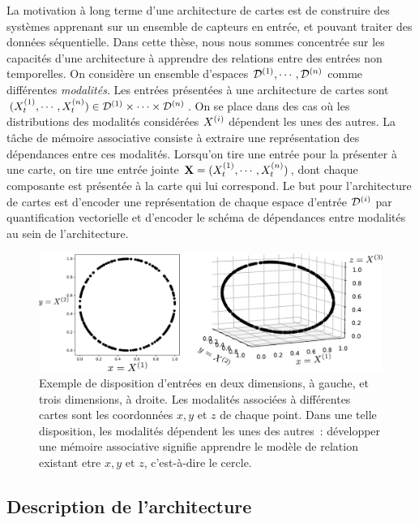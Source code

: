\documentclass[../main]{subfiles}
\begin{document}
La motivation à long terme d'une architecture de cartes est de construire des systèmes apprenant sur un ensemble de capteurs en entrée, et pouvant traiter des données séquentielle.
Dans cette thèse, nous nous sommes concentrée sur les capacités d'une architecture à apprendre des relations entre des entrées non temporelles. 
On considère un ensemble d'espaces $\mathcal{D}^{({1})}, \cdots , \mathcal{D}^{({n})}$ comme différentes \emph{modalités}.
Les entrées présentées à une architecture de cartes sont $(X^{({1})}_t, \cdots, X^{({n})}_t) \in \mathcal{D}^{({1})} \times \cdots \times \mathcal{D}^{({n})}$. On se place dans des cas où les distributions des modalités considérées $X^{({i})}$ dépendent les unes des autres. 
La tâche de mémoire associative consiste à extraire une représentation des dépendances entre ces modalités. 
Lorsqu'on tire une entrée pour la présenter à une carte, on tire une entrée jointe $\mathbf{X} =  (X^{({1})}_t, \cdots , X^{({n})}_t)$, dont chaque composante est présentée à la carte qui lui correspond. 
Le but pour l'architecture de cartes est d'encoder une représentation de chaque espace d'entrée $\mathcal{D}^{({i})}$ par quantification vectorielle et d'encoder le schéma de dépendances entre modalités au sein de l'architecture.

\begin{figure}
\centering
\includegraphics[width=\textwidth]{inputs_3som}
\caption{Exemple de disposition d'entrées en deux dimensions, à gauche, et trois dimensions, à droite. Les modalités associées à différentes cartes sont les coordonnées $x,y$ et $z$ de chaque point. Dans une telle disposition, les modalités dépendent les unes des autres~: développer une mémoire associative signifie apprendre le modèle de relation existant etre $x,y$ et $z$, c'est-à-dire le cercle.\label{fig:input_3som}}
\end{figure}

\subsection{Description de l'architecture}
\end{document}
